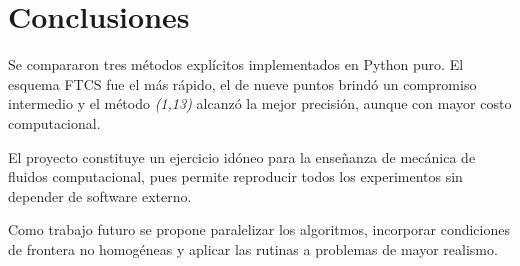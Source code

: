 \section{Conclusiones}
Se compararon tres m\'etodos expl\'icitos implementados en Python puro. El esquema FTCS fue el m\'as r\'apido, el de nueve puntos brind\'o un compromiso intermedio y el m\'etodo \emph{(1,13)} alcanz\'o la mejor precisi\'on, aunque con mayor costo computacional.

El proyecto constituye un ejercicio id\'oneo para la ense\~nanza de mec\'anica de fluidos computacional, pues permite reproducir todos los experimentos sin depender de software externo.

Como trabajo futuro se propone paralelizar los algoritmos, incorporar condiciones de frontera no homog\'eneas y aplicar las rutinas a problemas de mayor realismo.
